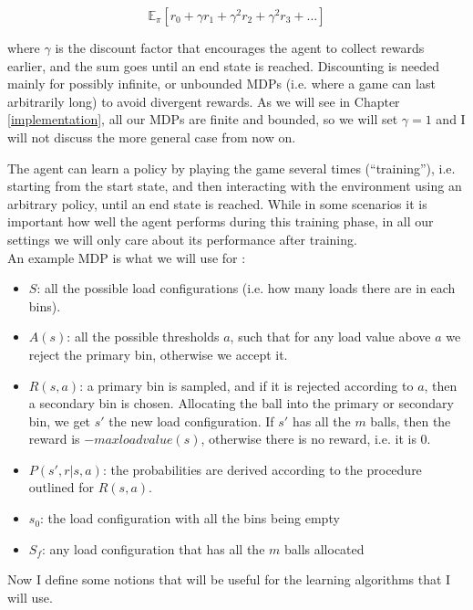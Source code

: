 \begin{equation}\label{eq:cumReward}
\mathbb{E}_{\pi}[r_{0} + \gamma r_{1} + \gamma^2 r_{2} + \gamma^2 r_{3} + ...]
\end{equation}

where $\gamma$ is the discount factor that encourages the agent to collect rewards earlier, and the sum goes until an end state is reached. Discounting is needed mainly for possibly infinite, or unbounded MDPs (i.e. where a game can last arbitrarily long) to avoid divergent rewards. As we will see in Chapter \ref{implementation}, all our MDPs are finite and bounded, so we will set $\gamma=1$ and I will not discuss the more general case from now on.


The agent can learn a policy by playing the game several times (``training''), i.e. starting from the start state, and then interacting with the environment using an arbitrary policy, until an end state is reached. While in some scenarios it is important how well the agent performs during this training phase, in all our settings we will only care about its performance after training.\\

An example MDP is what we will use for \TwoThinning:

\begin{itemize}
    \item 
    $S$: all the possible load configurations (i.e. how many loads there are in each bins).
    \item
    $A(s)$: all the possible thresholds $a$, such that for any load value above $a$ we reject the primary bin, otherwise we accept it.
    \item
    $R(s, a)$: a primary bin is sampled, and if it is rejected according to $a$, then a secondary bin is chosen. Allocating the ball into the primary or secondary bin, we get $s'$ the new load configuration. If $s'$ has all the $m$ balls, then the reward is $-maxloadvalue(s)$, otherwise there is no reward, i.e. it is $0$.
    \item
    $P(s', r | s, a)$: the probabilities are derived according to the procedure outlined for $R(s,a)$.
    \item
    $s_0$: the load configuration with all the bins being empty
    \item
    $S_f$: any load configuration that has all the $m$ balls allocated
\end{itemize}


Now I define some notions that will be useful for the learning algorithms that I will use.


